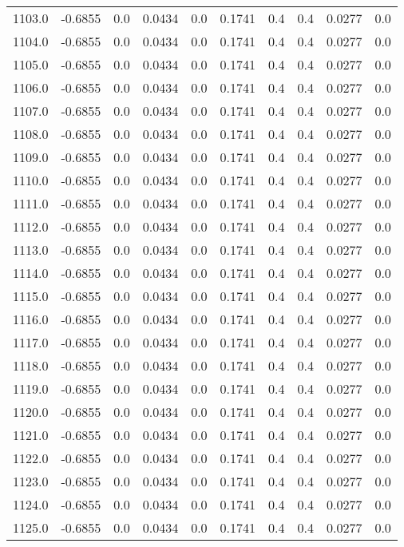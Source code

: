 \begin{longtable}{lrrrrrrrrr}
1103.0 & -0.6855 & 0.0 & 0.0434 & 0.0 & 0.1741 & 0.4 & 0.4 & 0.0277 & 0.0 \\
1104.0 & -0.6855 & 0.0 & 0.0434 & 0.0 & 0.1741 & 0.4 & 0.4 & 0.0277 & 0.0 \\
1105.0 & -0.6855 & 0.0 & 0.0434 & 0.0 & 0.1741 & 0.4 & 0.4 & 0.0277 & 0.0 \\
1106.0 & -0.6855 & 0.0 & 0.0434 & 0.0 & 0.1741 & 0.4 & 0.4 & 0.0277 & 0.0 \\
1107.0 & -0.6855 & 0.0 & 0.0434 & 0.0 & 0.1741 & 0.4 & 0.4 & 0.0277 & 0.0 \\
1108.0 & -0.6855 & 0.0 & 0.0434 & 0.0 & 0.1741 & 0.4 & 0.4 & 0.0277 & 0.0 \\
1109.0 & -0.6855 & 0.0 & 0.0434 & 0.0 & 0.1741 & 0.4 & 0.4 & 0.0277 & 0.0 \\
1110.0 & -0.6855 & 0.0 & 0.0434 & 0.0 & 0.1741 & 0.4 & 0.4 & 0.0277 & 0.0 \\
1111.0 & -0.6855 & 0.0 & 0.0434 & 0.0 & 0.1741 & 0.4 & 0.4 & 0.0277 & 0.0 \\
1112.0 & -0.6855 & 0.0 & 0.0434 & 0.0 & 0.1741 & 0.4 & 0.4 & 0.0277 & 0.0 \\
1113.0 & -0.6855 & 0.0 & 0.0434 & 0.0 & 0.1741 & 0.4 & 0.4 & 0.0277 & 0.0 \\
1114.0 & -0.6855 & 0.0 & 0.0434 & 0.0 & 0.1741 & 0.4 & 0.4 & 0.0277 & 0.0 \\
1115.0 & -0.6855 & 0.0 & 0.0434 & 0.0 & 0.1741 & 0.4 & 0.4 & 0.0277 & 0.0 \\
1116.0 & -0.6855 & 0.0 & 0.0434 & 0.0 & 0.1741 & 0.4 & 0.4 & 0.0277 & 0.0 \\
1117.0 & -0.6855 & 0.0 & 0.0434 & 0.0 & 0.1741 & 0.4 & 0.4 & 0.0277 & 0.0 \\
1118.0 & -0.6855 & 0.0 & 0.0434 & 0.0 & 0.1741 & 0.4 & 0.4 & 0.0277 & 0.0 \\
1119.0 & -0.6855 & 0.0 & 0.0434 & 0.0 & 0.1741 & 0.4 & 0.4 & 0.0277 & 0.0 \\
1120.0 & -0.6855 & 0.0 & 0.0434 & 0.0 & 0.1741 & 0.4 & 0.4 & 0.0277 & 0.0 \\
1121.0 & -0.6855 & 0.0 & 0.0434 & 0.0 & 0.1741 & 0.4 & 0.4 & 0.0277 & 0.0 \\
1122.0 & -0.6855 & 0.0 & 0.0434 & 0.0 & 0.1741 & 0.4 & 0.4 & 0.0277 & 0.0 \\
1123.0 & -0.6855 & 0.0 & 0.0434 & 0.0 & 0.1741 & 0.4 & 0.4 & 0.0277 & 0.0 \\
1124.0 & -0.6855 & 0.0 & 0.0434 & 0.0 & 0.1741 & 0.4 & 0.4 & 0.0277 & 0.0 \\
1125.0 & -0.6855 & 0.0 & 0.0434 & 0.0 & 0.1741 & 0.4 & 0.4 & 0.0277 & 0.0 \\

\end{longtable}
